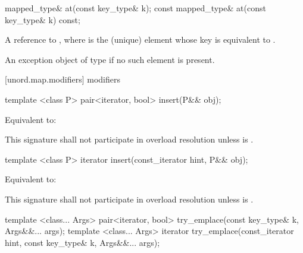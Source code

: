 %
%
%
\begin{itemdecl}
mapped_type& at(const key_type& k);
const mapped_type& at(const key_type& k) const;
\end{itemdecl}

\begin{itemdescr}
\pnum
\returns A reference to , where  is the (unique) element whose key is equivalent to .

\pnum
\throws An exception object of type  if no such element is present.
\end{itemdescr}

[unord.map.modifiers]{ modifiers}

%
%
\begin{itemdecl}
template <class P>
  pair<iterator, bool> insert(P&& obj);
\end{itemdecl}

\begin{itemdescr}
\pnum
\effects Equivalent to: 

\pnum
\remarks This signature shall not participate in overload resolution
unless  is .
\end{itemdescr}

%
%
\begin{itemdecl}
template <class P>
  iterator insert(const_iterator hint, P&& obj);
\end{itemdecl}

\begin{itemdescr}
\pnum
\effects Equivalent to:

\pnum
\remarks This signature shall not participate in overload resolution
unless  is .
\end{itemdescr}

%
%
\begin{itemdecl}
template <class... Args> pair<iterator, bool> try_emplace(const key_type& k, Args&&... args);
template <class... Args> iterator try_emplace(const_iterator hint, const key_type& k, Args&&... args);
\end{itemdecl}

